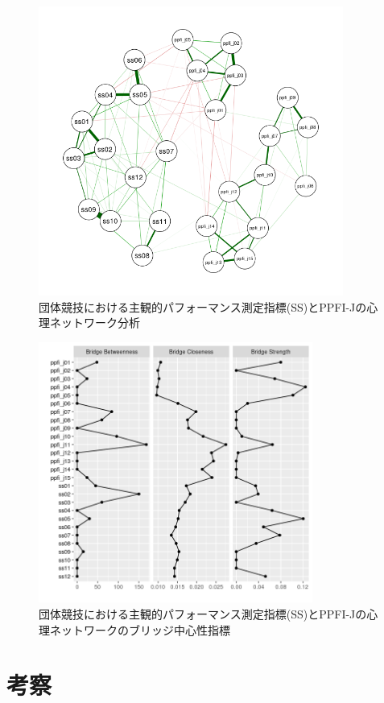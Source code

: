 \documentclass[12pt,a4paper,xelatex,ja=standard]{bxjsarticle}
\begin{document}
\begin{figure}[H]
\centering
\includegraphics[clip,width = 10cm]{team network.png}
\caption{団体競技における主観的パフォーマンス測定指標(SS)とPPFI-Jの心理ネットワーク分析}
\end{figure}

\begin{figure}[H]
\centering
\includegraphics[clip,width = 9cm]{team bridge.png}
\caption{団体競技における主観的パフォーマンス測定指標(SS)とPPFI-Jの心理ネットワークのブリッジ中心性指標}
\end{figure}

\clearpage

\hypertarget{ux8003ux5bdf}{%
\section{考察}\label{ux8003ux5bdf}}
\end{document}
